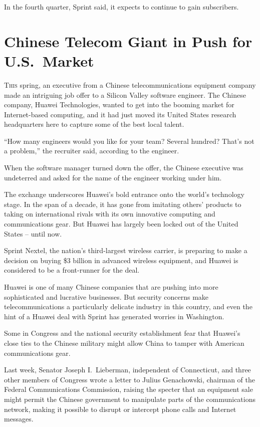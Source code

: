 ﻿\documentclass[12pt]{article}
\begin{document}
In the fourth quarter, Sprint said, it expects to continue to gain subscribers.

\section{Chinese Telecom Giant in Push for U.S.~Market}

\lettrine{T}{his} spring, an executive from a Chinese telecommunications
equipment company made an intriguing job offer to a Silicon Valley software engineer. The Chinese
company, Huawei Technologies, wanted to get into the booming market for Internet-based computing,
and it had just moved its United States research headquarters here to capture some of the best local
talent.

``How many engineers would you like for your team? Several hundred? That's not a problem,'' the
recruiter said, according to the engineer.

When the software manager turned down the offer, the Chinese executive was undeterred and asked for
the name of the engineer working under him.

The exchange underscores Huawei's bold entrance onto the world's technology stage. In the span of a
decade, it has gone from imitating others' products to taking on international rivals with its own
innovative computing and communications gear. But Huawei has largely been locked out of the United
States -- until now.

Sprint Nextel, the nation's third-largest wireless carrier, is preparing to make a decision on
buying \$3 billion in advanced wireless equipment, and Huawei is considered to be a front-runner for
the deal.

Huawei is one of many Chinese companies that are pushing into more sophisticated and lucrative
businesses. But security concerns make telecommunications a particularly delicate industry in this
country, and even the hint of a Huawei deal with Sprint has generated worries in Washington.

Some in Congress and the national security establishment fear that Huawei's close ties to the
Chinese military might allow China to tamper with American communications gear.

Last week, Senator Joseph I.~Lieberman, independent of Connecticut, and three other members of
Congress wrote a letter to Julius Genachowski, chairman of the Federal Communications Commission,
raising the specter that an equipment sale might permit the Chinese government to manipulate parts
of the communications network, making it possible to disrupt or intercept phone calls and Internet
messages.
\end{document}
